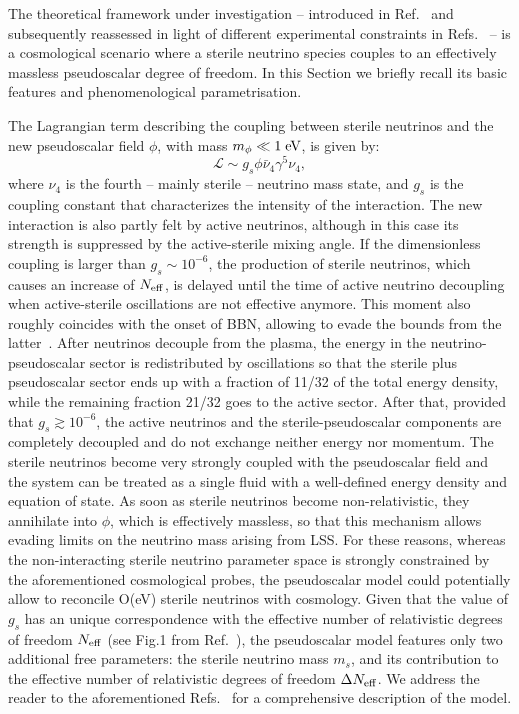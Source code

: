 \documentclass[a4paper,11pt]{article}
\begin{document}
The theoretical framework under investigation -- introduced in Ref.~\cite{Archidiacono:2014nda} and subsequently reassessed in light of different experimental constraints in Refs.~\cite{Archidiacono:2014nda,Archidiacono:2015oma,Archidiacono:2016kkh,Archidiacono:2020yey} -- is a cosmological scenario where a sterile neutrino species couples to an effectively massless pseudoscalar degree of freedom.
In this Section we briefly recall its basic features and phenomenological parametrisation.


The Lagrangian term describing the coupling between sterile neutrinos and the
new pseudoscalar field $\phi$, with mass $m_\phi \ll 1\;\rm{eV}$, is given by:
% 
\begin{equation}
    \mathcal{L}\sim g_s \phi \bar{\nu}_4\gamma^5 \nu_4,
\end{equation}
%
where $\nu_4$ is the fourth -- mainly sterile -- neutrino mass state, and $g_s$ is the coupling constant that characterizes the intensity of the interaction.
The new interaction is also partly felt by active neutrinos, although {in this case its strength is} suppressed by the {active-sterile} mixing angle. 
If the dimensionless coupling is larger than $g_s\sim 10^{-6}$, the production of sterile neutrinos, {which causes} an increase of $N_{\rm{eff}}$, is delayed until the time of active neutrino decoupling {when active-sterile oscillations are not effective anymore. This moment also} roughly coincides with the onset of BBN, allowing to evade the bounds from the latter~\cite{Schoneberg:2019wmt}.
After neutrinos decouple from the plasma, the energy in the neutrino-pseudoscalar sector is redistributed by oscillations so that the sterile plus pseudoscalar sector ends up with a fraction of 11/32 of the total energy density, while the remaining fraction 21/32 goes to the active sector.
After that, provided that $g_s\gtrsim 10^{-6}$, the active {neutrinos} and the sterile-pseudoscalar components are completely decoupled and do not exchange neither energy nor momentum.
The sterile neutrinos become very strongly coupled with the pseudoscalar field and the system can be treated as a single fluid with a well-defined energy density and equation of state.
As soon as sterile neutrinos become non-relativistic, they annihilate into $\phi$, {which is effectively massless}, so that this mechanism allows evading limits on the neutrino mass arising from LSS.
For these reasons, whereas the non-interacting sterile neutrino parameter space is strongly constrained by the aforementioned cosmological probes, the pseudoscalar model could potentially allow to reconcile O(eV) sterile neutrinos with cosmology.
Given that the value of $g_s$ {has an unique correspondence with} the effective number of relativistic degrees of freedom $N_{\rm eff}$ (see Fig.1 from Ref.~\cite{Archidiacono:2014nda}), the pseudoscalar model features only two additional free parameters: the sterile neutrino mass $m_s$, and its contribution to the effective number of relativistic degrees of freedom $\Delta N_{\rm eff}$.
We address the reader to the aforementioned Refs.~\cite{Archidiacono:2014nda,Archidiacono:2015oma,Archidiacono:2016kkh,Archidiacono:2020yey} for a comprehensive description of the model.
\end{document}
